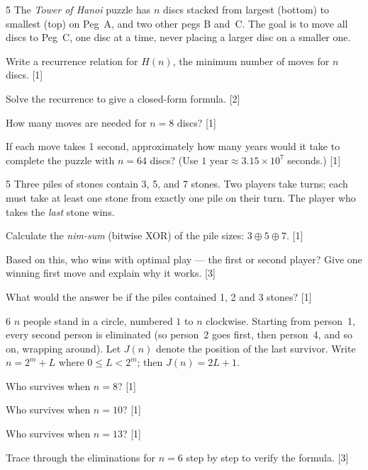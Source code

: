 \begin{problem}{5}
The \emph{Tower of Hanoi} puzzle has $n$ discs stacked from largest (bottom)
to smallest (top) on Peg~A, and two other pegs B and~C. The goal is to move
all discs to Peg~C, one disc at a time, never placing a larger disc on a
smaller one.
\begin{parts}
  \item Write a recurrence relation for $H(n)$, the minimum number of moves
        for $n$ discs. \hfill [1]
  \item Solve the recurrence to give a closed-form formula. \hfill [2]
  \item How many moves are needed for $n = 8$ discs? \hfill [1]
  \item If each move takes 1 second, approximately how many years would it
        take to complete the puzzle with $n = 64$ discs?
        (Use $1\text{ year} \approx 3.15 \times 10^7$ seconds.) \hfill [1]
\end{parts}
\answerline
\end{problem}

\begin{problem}{5}
Three piles of stones contain 3, 5, and 7 stones. Two players take turns;
each must take at least one stone from exactly one pile on their turn. The
player who takes the \emph{last} stone wins.
\begin{parts}
  \item Calculate the \emph{nim-sum} (bitwise XOR) of the pile sizes:
        $3 \oplus 5 \oplus 7$. \hfill [1]
  \item Based on this, who wins with optimal play --- the first or second player?
        Give one winning first move and explain why it works. \hfill [3]
  \item What would the answer be if the piles contained 1, 2 and 3 stones? \hfill [1]
\end{parts}
\answerline
\end{problem}

\begin{problem}{6}
$n$ people stand in a circle, numbered $1$ to $n$ clockwise. Starting from
person~1, every second person is eliminated (so person~2 goes first,
then person~4, and so on, wrapping around). Let $J(n)$ denote the position
of the last survivor. Write $n = 2^m + L$ where $0 \le L < 2^m$; then
$J(n) = 2L + 1$.
\begin{parts}
  \item Who survives when $n = 8$? \hfill [1]
  \item Who survives when $n = 10$? \hfill [1]
  \item Who survives when $n = 13$? \hfill [1]
  \item Trace through the eliminations for $n = 6$ step by step to verify
        the formula. \hfill [3]
\end{parts}
\answerline
\end{problem}

